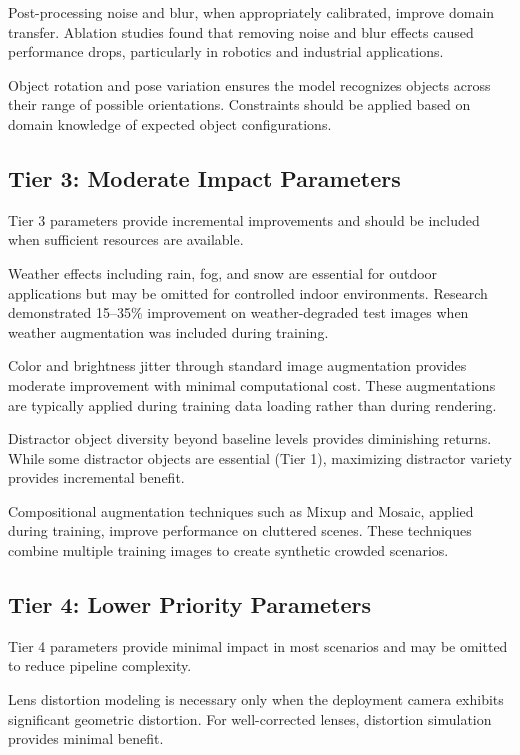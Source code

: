 Post-processing noise and blur, when appropriately calibrated, improve domain transfer. Ablation studies found that removing noise and blur effects caused performance drops, particularly in robotics and industrial applications.

Object rotation and pose variation ensures the model recognizes objects across their range of possible orientations. Constraints should be applied based on domain knowledge of expected object configurations.

\subsection{Tier 3: Moderate Impact Parameters}

Tier 3 parameters provide incremental improvements and should be included when sufficient resources are available.

Weather effects including rain, fog, and snow are essential for outdoor applications but may be omitted for controlled indoor environments. Research demonstrated 15--35\% improvement on weather-degraded test images when weather augmentation was included during training.

Color and brightness jitter through standard image augmentation provides moderate improvement with minimal computational cost. These augmentations are typically applied during training data loading rather than during rendering.

Distractor object diversity beyond baseline levels provides diminishing returns. While some distractor objects are essential (Tier 1), maximizing distractor variety provides incremental benefit.

Compositional augmentation techniques such as Mixup and Mosaic, applied during training, improve performance on cluttered scenes. These techniques combine multiple training images to create synthetic crowded scenarios.

\subsection{Tier 4: Lower Priority Parameters}

Tier 4 parameters provide minimal impact in most scenarios and may be omitted to reduce pipeline complexity.

Lens distortion modeling is necessary only when the deployment camera exhibits significant geometric distortion. For well-corrected lenses, distortion simulation provides minimal benefit.

